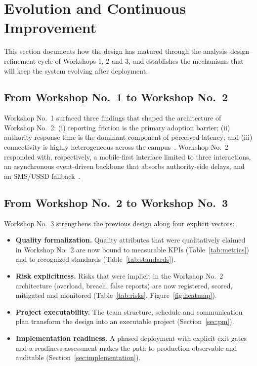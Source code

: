 \documentclass[conference,a4paper,10pt]{IEEEtran}
\begin{document}
\section{Evolution and Continuous Improvement}
\label{sec:evolution}

This section documents how the design has matured through the
analysis--design--refinement cycle of Workshops 1, 2 and 3, and establishes
the mechanisms that will keep the system evolving after deployment.

\subsection{From Workshop No.\ 1 to Workshop No.\ 2}

Workshop No.\ 1 surfaced three findings that shaped the architecture of
Workshop No.\ 2: (i) reporting friction is the primary adoption barrier;
(ii) authority response time is the dominant component of perceived
latency; and (iii) connectivity is highly heterogeneous across the
campus~\cite{csas_w1}. Workshop No.\ 2 responded with, respectively, a
mobile-first interface limited to three interactions, an asynchronous
event-driven backbone that absorbs authority-side delays, and an SMS/USSD
fallback~\cite{csas_w2}.

\subsection{From Workshop No.\ 2 to Workshop No.\ 3}

Workshop No.\ 3 strengthens the previous design along four explicit
vectors:

\begin{itemize}[leftmargin=*]
  \item \textbf{Quality formalization.} Quality attributes that were
  qualitatively claimed in Workshop No.\ 2 are now bound to measurable
  KPIs (Table~\ref{tab:metrics}) and to recognized standards
  (Table~\ref{tab:standards}).
  \item \textbf{Risk explicitness.} Risks that were implicit in the
  Workshop No.\ 2 architecture (overload, breach, false reports) are now
  registered, scored, mitigated and monitored
  (Table~\ref{tab:risks}, Figure~\ref{fig:heatmap}).
  \item \textbf{Project executability.} The team structure, schedule and
  communication plan transform the design into an executable project
  (Section~\ref{sec:pm}).
  \item \textbf{Implementation readiness.} A phased deployment with
  explicit exit gates and a readiness assessment makes the path to
  production observable and auditable
  (Section~\ref{sec:implementation}).
\end{itemize}
\end{document}
